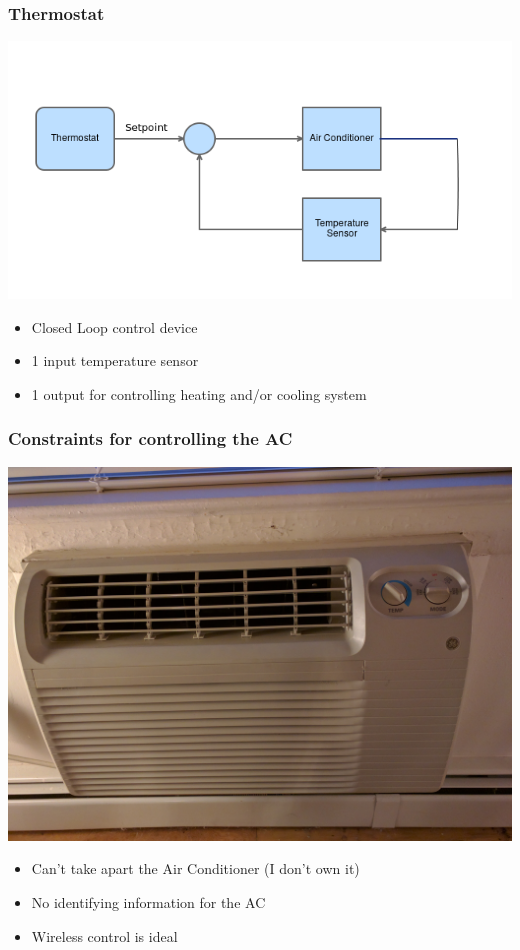 \documentclass[aspectratio=169,11pt,hyperref={colorlinks=true}]{beamer}
\begin{document}
\begin{frame}
    \frametitle{Thermostat}
    \begin{center}
    \includegraphics[width=.8\textwidth]{flowchart.png}
    \end{center}
    \begin{itemize}
        \item Closed Loop control device
        \item 1 input temperature sensor
        \item 1 output for controlling heating and/or cooling system
    \end{itemize}
\end{frame}

\begin{frame}
    \frametitle{Constraints for controlling the AC}
    \begin{center}
        \includegraphics[width=.53\textwidth]{AC_unit.jpeg}
    \end{center}
    \begin{itemize}
        \item Can't take apart the Air Conditioner (I don't own it)
        \item No identifying information for the AC
        \item Wireless control is ideal
    \end{itemize}
\end{frame}
\end{document}
